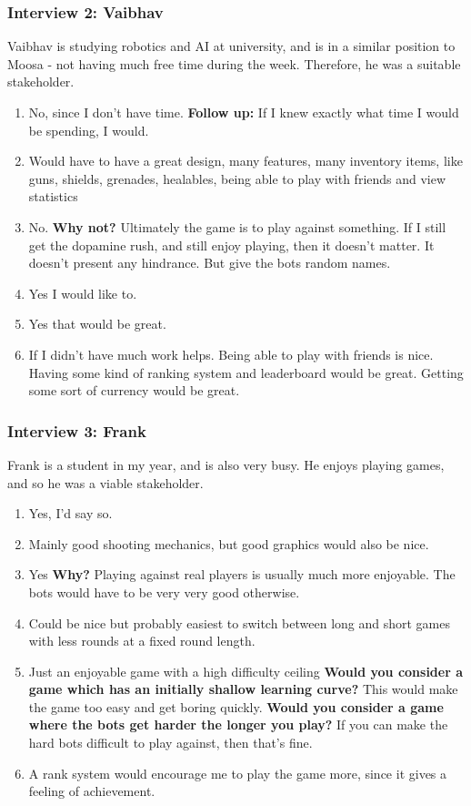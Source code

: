 \vs
\subsubsection{Interview 2: Vaibhav}
Vaibhav is studying robotics and AI at university, and is in a similar position to Moosa - not having much free time during the week. Therefore, he was a suitable stakeholder.
\begin{enumerate}[label=\arabic*)]
    \item No, since I don't have time.
    \subitem \textbf{Follow up:} If I knew exactly what time I would be spending, I would.
    \item Would have to have a great design, many features, many inventory items, like guns, shields, grenades, healables, being able to play with friends and view statistics
    \item No.
    \subitem \textbf{Why not?} Ultimately the game is to play against something. If I still get the dopamine rush, and still enjoy playing, then it doesn't matter. It doesn't present any hindrance. But give the bots random names.
    \item Yes I would like to.
    \item Yes that would be great.
    \item If I didn't have much work helps. Being able to play with friends is nice. Having some kind of ranking system and leaderboard would be great. Getting some sort of currency would be great.
\end{enumerate}

\vs


\subsubsection{Interview 3: Frank}
Frank is a student in my year, and is also very busy. He enjoys playing games, and so he was a viable stakeholder.

\vs
\begin{enumerate}[label=\arabic*)]
    \item Yes, I'd say so.
    \item Mainly good shooting mechanics, but good graphics would also be nice.
    \item Yes
    \subitem \textbf{Why?} Playing against real players is usually much more enjoyable. The bots would have to be very very good otherwise.
    \item Could be nice but probably easiest to switch between long and short games with less rounds at a fixed round length.
    \item Just an enjoyable game with a high difficulty ceiling
    \subitem \textbf{Would you consider a game which has an initially shallow learning curve?} This would make the game too easy and get boring quickly.
    \subitem \textbf{Would you consider a game where the bots get harder the longer you play?} If you can make the hard bots difficult to play against, then that's fine.
    \item A rank system would encourage me to play the game more, since it gives a feeling of achievement.
\end{enumerate}

